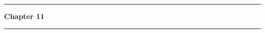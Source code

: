 \documentclass[12pt, a4paper]{article}
\begin{document}
	\maketitle

	\begin{center}
		\begin{Large}
			\hrule
			\vspace{0.5em}
			\textbf{Chapter 11} 
			\vspace{0.5em}
			\hrule
		\end{Large}
	\end{center}

	\begin{problem}[4]
	\end{problem}

	\begin{problem}
	\end{problem}

	\begin{problem}[9]
	\end{problem}

	\begin{problem}[14]
	\end{problem}
\end{document}

